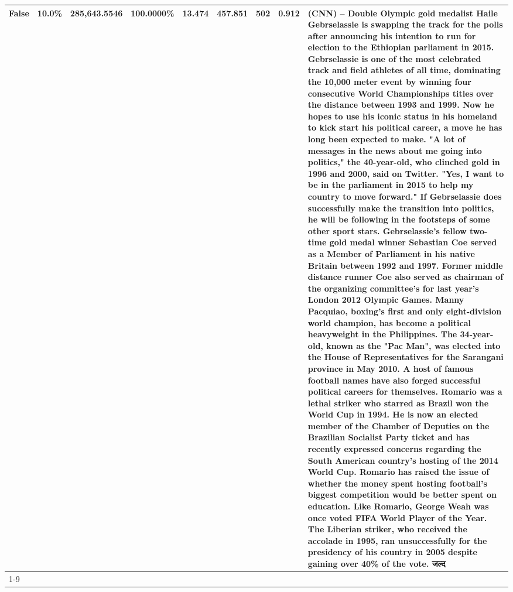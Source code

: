 \begin{table}[H]
{\begin{tabular}{lllrlllll}
False & 10.0\% & 285,643.5546 & \bfseries \color{red} 100.0000\% & 13.474 & 457.851 & 502 & 0.912 & (CNN) -- Double Olympic gold medalist Haile Gebrselassie is swapping the track for the polls after announcing his intention to run for election to the Ethiopian parliament in 2015. Gebrselassie is one of the most celebrated track and field athletes of all time, dominating the 10,000 meter event by winning four consecutive World Championships titles over the distance between 1993 and 1999. Now he hopes to use his iconic status in his homeland to kick start his political career, a move he has long been expected to make. "A lot of messages in the news about me going into politics," the 40-year-old, who clinched gold in 1996 and 2000, said on Twitter. "Yes, I want to be in the parliament in 2015 to help my country to move forward." If Gebrselassie does successfully make the transition into politics, he will be following in the footsteps of some other sport stars. Gebrselassie's fellow two-time gold medal winner Sebastian Coe served as a Member of Parliament in his native Britain between 1992 and 1997. Former middle distance runner Coe also served as chairman of the organizing committee's for last year's London 2012 Olympic Games. Manny Pacquiao, boxing's first and only eight-division world champion, has become a political heavyweight in the Philippines. The 34-year-old, known as the "Pac Man", was elected into the House of Representatives for the Sarangani province in May 2010. A host of famous football names have also forged successful political careers for themselves. Romario was a lethal striker who starred as Brazil won the World Cup in 1994. He is now an elected member of the Chamber of Deputies on the Brazilian Socialist Party ticket and has recently expressed concerns regarding the South American country's hosting of the 2014 World Cup. Romario has raised the issue of whether the money spent hosting football's biggest competition would be better spent on education. Like Romario, George Weah was once voted FIFA World Player of the Year. The Liberian striker, who received the accolade in 1995, ran unsuccessfully for the presidency of his country in 2005 despite gaining over 40\% of the vote. जल्द \\
\cline{1-9}

\end{tabular}}
\end{table}
